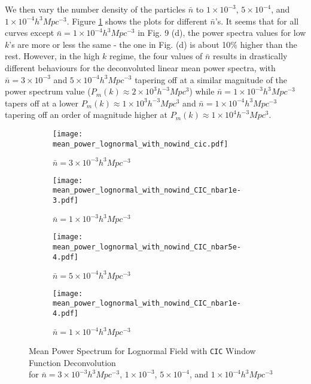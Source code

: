\documentclass[11pt, letterpaper, twoside]{article}
\begin{document}
We then vary the number density of the particles $\bar{n}$ to $1\times10^{-3}$, $5\times10^{-4}$, and $1\times10^{-4} h^3 Mpc^{-3}$. Figure \ref{fig:mean_nbar} shows the plots for different $\bar{n}$'s. It seems that for all curves except $\bar{n} = 1\times10^{-4} h^3 Mpc^{-3}$ in Fig. 9 (d), the power spectra values for low $k$'s are more or less the same - the one in Fig. (d) is about 10\% higher than the rest. However, in the high $k$ regime, the four values of $\bar{n}$ results in drastically different behaviours for the deconvoluted linear mean power spectra, with $\bar{n} = 3\times10^{-3}$ and $5\times10^{-4} h^3 Mpc^{-3}$ tapering off at a similar magnitude of the power spectrum value ($P_m(k)\approx2\times 10^{3} h^{-3} Mpc^{3}$) while $\bar{n} = 1\times10^{-3}h^3 Mpc^{-3}$ tapers off at a lower $P_m(k)\approx1\times 10^{3} h^{-3} Mpc^{3}$ and $\bar{n} = 1\times10^{-4}h^3 Mpc^{-3}$ tapering off an order of magnitude higher at $P_m(k)\approx1\times 10^{4} h^{-3} Mpc^{3}$. 

\newpage
\begin{figure}[t!]
    \centering
    \begin{subfigure}[b]{0.49\textwidth}
        \texttt{[image: mean\_power\_lognormal\_with\_nowind\_cic.pdf]}
        \cprotect\caption{$\bar{n} = 3\times10^{-3}h^3Mpc^{-3}$\\}
    \end{subfigure}
    \begin{subfigure}[b]{0.49\textwidth}
        \texttt{[image: mean\_power\_lognormal\_with\_nowind\_CIC\_nbar1e-3.pdf]}
        \cprotect\caption{$\bar{n} = 1\times10^{-3}h^3Mpc^{-3}$\\}
    \end{subfigure}
    \begin{subfigure}[b]{0.49\textwidth}
        \texttt{[image: mean\_power\_lognormal\_with\_nowind\_CIC\_nbar5e-4.pdf]}
        \cprotect\caption{$\bar{n} = 5\times10^{-4}h^3Mpc^{-3}$}
    \end{subfigure}
    \begin{subfigure}[b]{0.49\textwidth}
        \texttt{[image: mean\_power\_lognormal\_with\_nowind\_CIC\_nbar1e-4.pdf]}
        \cprotect\caption{$\bar{n} = 1\times10^{-4}h^3Mpc^{-3}$}
    \end{subfigure}
    \cprotect\caption{Mean Power Spectrum for Lognormal Field with \verb|CIC| Window Function Deconvolution\\for $\bar{n} = 3\times10^{-3}h^3Mpc^{-3}$, $1\times10^{-3}$, $5\times10^{-4}$, and $1\times10^{-4} h^3Mpc^{-3}$}
    \label{fig:mean_nbar}
\end{figure}
\end{document}
